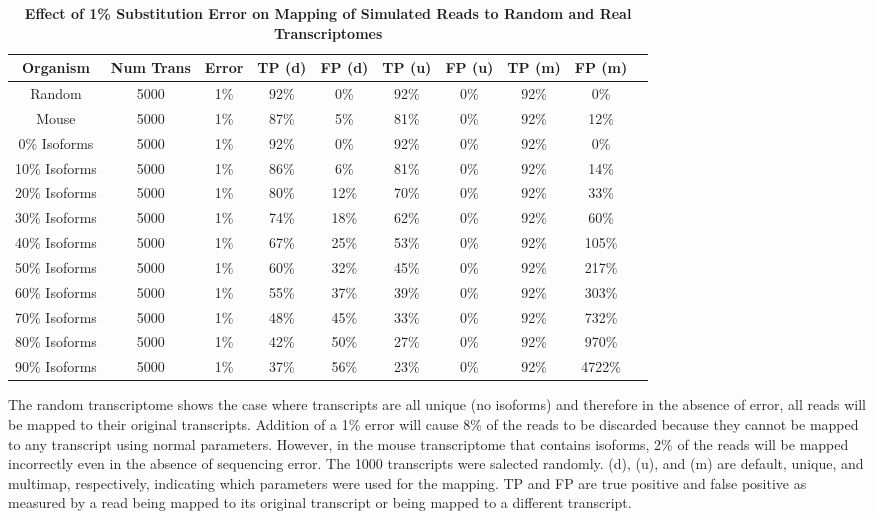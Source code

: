 \documentclass[10pt]{article}
\begin{document}
\begin{table}[!ht]
\caption{
\bf{Effect of 1\% Substitution Error on Mapping of Simulated Reads to Random and Real Transcriptomes }}
\begin{tabular}{|c|c|c||c|c||c|c||c|c||c|}
\hline
Organism & Num Trans & Error  & TP (d) & FP (d) & TP (u) & FP (u) & TP (m) & FP (m)\\
\hline
Random & 5000 & 1\% & 92\%& 0\%&92\%&0\%&92\%&0\%\\
\hline
Mouse & 5000 & 1\% & 87\%& 5\%&81\%&0\%&92\%&12\%\\
\hline
0\% Isoforms & 5000 & 1\% & 92\% & 0\% & 92\% & 0\% & 92\% & 0\%\\
10\% Isoforms & 5000 & 1\% & 86\% & 6\% & 81\% & 0\% & 92\% & 14\%\\
20\% Isoforms & 5000 & 1\% & 80\% & 12\% & 70\% & 0\% & 92\% & 33\%\\
30\% Isoforms & 5000 & 1\% & 74\% & 18\% & 62\% & 0\% & 92\% & 60\%\\
40\% Isoforms & 5000 & 1\% & 67\% & 25\% & 53\% & 0\% & 92\% & 105\%\\
50\% Isoforms & 5000 & 1\% & 60\% & 32\% & 45\% & 0\% & 92\% & 217\%\\
60\% Isoforms & 5000 & 1\% & 55\% & 37\% & 39\% & 0\% & 92\% & 303\%\\
70\% Isoforms & 5000 & 1\% & 48\% & 45\% & 33\% & 0\% & 92\% & 732\%\\
80\% Isoforms & 5000 & 1\% & 42\% & 50\% & 27\% & 0\% & 92\% & 970\%\\
90\% Isoforms & 5000 & 1\% & 37\% & 56\% & 23\% & 0\% & 92\% & 4722\%\\
\hline
\end{tabular}
\begin{flushleft}The random transcriptome shows the case where transcripts are all unique (no isoforms) and therefore in the absence of error, all reads will be mapped to their original transcripts.  Addition of a 1\% error will cause 8\% of the reads to be discarded because they cannot be mapped to any transcript using normal parameters.  However, in the mouse transcriptome that contains isoforms, 2\% of the reads will be mapped incorrectly even in the absence of sequencing error.  The 1000 transcripts were salected randomly.  (d), (u), and (m) are default, unique, and multimap, respectively, indicating which parameters were used for the mapping.  TP and FP are true positive and false positive as measured by a read being mapped to its original transcript or being mapped to a different transcript.
\end{flushleft}
\label{tab:validation}
\end{table}
\end{document}
